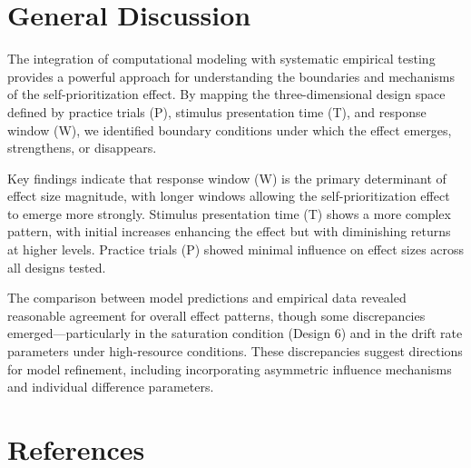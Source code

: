 \documentclass[
  english,
  man,floatsintext]{apa6}
\begin{document}
\section{General Discussion}\label{general-discussion}

The integration of computational modeling with systematic empirical testing provides a powerful approach for understanding the boundaries and mechanisms of the self-prioritization effect. By mapping the three-dimensional design space defined by practice trials (P), stimulus presentation time (T), and response window (W), we identified boundary conditions under which the effect emerges, strengthens, or disappears.

Key findings indicate that response window (W) is the primary determinant of effect size magnitude, with longer windows allowing the self-prioritization effect to emerge more strongly. Stimulus presentation time (T) shows a more complex pattern, with initial increases enhancing the effect but with diminishing returns at higher levels. Practice trials (P) showed minimal influence on effect sizes across all designs tested.

The comparison between model predictions and empirical data revealed reasonable agreement for overall effect patterns, though some discrepancies emerged---particularly in the saturation condition (Design 6) and in the drift rate parameters under high-resource conditions. These discrepancies suggest directions for model refinement, including incorporating asymmetric influence mechanisms and individual difference parameters.

\section{References}\label{references}
\end{document}
